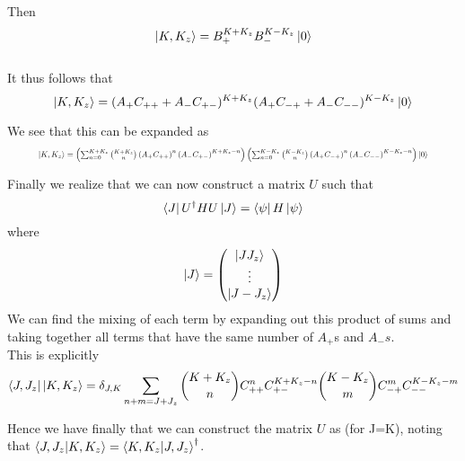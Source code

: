 \documentclass[11pt]{article} %
\begin{document}
Then\\
\begin{equation} \ket{K, K_z}=B_+^{K+K_{z}}B_-^{K-K_z}\ket{0}\end{equation}\\

It thus follows that\\

\begin{equation}
\ket{K,K_z}=(A_+ C_{++}+A_- C_{+-})^{K+K_z} (A_+ C_{-+}+A_- C_{--})^{K-K_z}\ket{0}\end{equation}

We see that this can be expanded as\\

\begin{equation}\resizebox{.9\hsize}{!}{$
\ket{K,K_z}=\left( \sum_{n=0}^{K+K_z} \binom{K+K_z}{n} \left(A_+ C_{++}\right)^n\left(A_- C_{+-}\right)^{K+K_z-n}\right)\left( \sum_{n=0}^{K-K_z} \binom{K-K_z}{n} \left(A_+ C_{-+}\right)^n\left(A_- C_{--}\right)^{K-K_z-n}\right)\ket{0}$}
\end{equation}



Finally we realize that we can now construct a matrix $U$ such that \begin{equation} \bra{J}U^\dagger H U \ket{J}=\bra{\psi}H\ket{\psi}\end{equation} where \begin{equation}\ket{J}=\begin{pmatrix} \ket{J J_z} \\ \vdots \\ \ket{J -J_z}\end{pmatrix} \end{equation}  We can find the mixing of each term by expanding out this product of sums and taking together all terms that have the same number of $A_+$s and $A_-s$.\\

This is explicitly\\

\begin{equation}
\bra{J,J_z}\ket{K,K_z}=	\delta_{J,K}\sum_{n+m=J+J_z} \binom{K+K_z}{n}C_{++}^nC_{+-}^{K+K_z-n}\binom{K-K_z}{m}C_{-+}^m C_{--}^{K-K_z-m}
\end{equation} 

Hence we have finally that we can construct the matrix $U$ as (for J=K), noting that $\braket{J,J_z|K,K_z}=\braket{K,K_z|J,J_z}^\dagger$. \\
\end{document}
